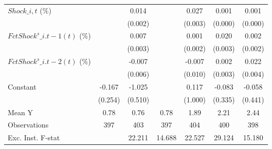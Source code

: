 {\begin{tabular}{l*{6}{c}}
\addlinespace
$ Shock\_{i,t}$ (\%) &                     &       0.014\sym{***}&                     &       0.027\sym{***}&       0.001\sym{**} &       0.001\sym{*}  \\
                    &                     &     (0.002)         &                     &     (0.003)         &     (0.000)         &     (0.000)         \\
\addlinespace
$ FctShock^s\_{i.t-1}(t)$ (\%)&                     &       0.007\sym{**} &                     &       0.001         &       0.020\sym{***}&       0.002         \\
                    &                     &     (0.003)         &                     &     (0.002)         &     (0.003)         &     (0.002)         \\
\addlinespace
$ FctShock^s\_{i.t-2}(t)$ (\%)&                     &      -0.007         &                     &      -0.007         &       0.002         &       0.022\sym{***}\\
                    &                     &     (0.006)         &                     &     (0.010)         &     (0.003)         &     (0.004)         \\
\addlinespace
Constant            &      -0.167         &      -1.025\sym{*}  &                     &       0.117         &      -0.083         &      -0.058         \\
                    &     (0.254)         &     (0.510)         &                     &     (1.000)         &     (0.335)         &     (0.441)         \\
\midrule
Mean Y              &        0.78         &        0.76         &        0.78         &        1.89         &        2.21         &        2.44         \\
Observations        &         397         &         403         &         397         &         404         &         400         &         398         \\
Exc. Inst. F-stat   &                     &      22.211         &      14.688         &      22.527         &      29.124         &      15.180         \\
\bottomrule
\end{tabular}
}
